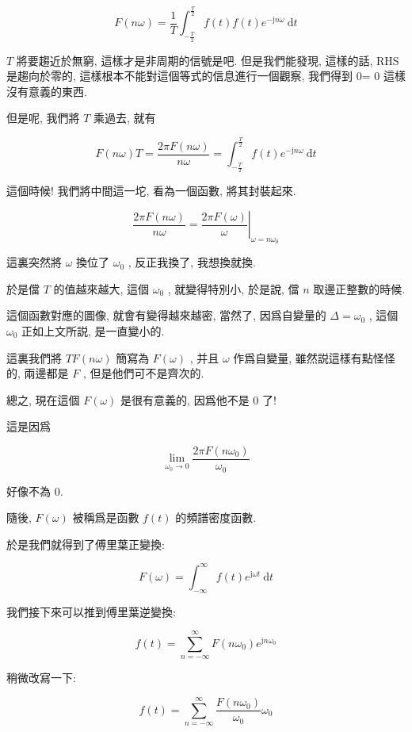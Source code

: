 \documentclass[a4paper, 10pt]{ctexbook} %
\begin{document}
$$ F \left( n \omega \right) =  \frac{1}{T} \int ^{\frac{T}{2}}_{-\frac{T}{2}} f\left(t\right) f\left(t\right) e ^{-\mathrm{j} n \omega  }\ \mathrm{d}t$$

$T$ 將要趨近於無窮, 這樣才是非周期的信號是吧. 但是我們能發現, 這樣的話, RHS是趨向於零的, 這樣根本不能對這個等式的信息進行一個觀察, 我們得到 0= 0 這樣沒有意義的東西. 

但是呢, 我們將 $T$ 乘過去, 就有

$$ F \left( n \omega\right) T =  \frac{2\pi F \left(n \omega \right)}{n \omega} = \int ^{\frac{T}{2}}_{- \frac{T}{2}} f\left(t\right) e^{ - \mathrm{j} n \omega   }\ \mathrm{d}t$$

這個時候! 我們將中間這一坨, 看為一個函數, 將其封裝起來.

$$\frac{2\pi F \left(n \omega \right)}{n\omega} = \left.\frac{2 \pi F \left(\omega\right)}{\omega} \right|_{\omega = n \omega_{0}}$$

這裏突然將 $\omega$ 換位了 $\omega _{0}$ , 反正我換了, 我想換就換. 

於是儅 $T$ 的值越來越大, 這個 $\omega _{0}$ , 就變得特別小, 於是說, 儅 $n$ 取邊正整數的時候. 

這個函數對應的圖像, 就會有變得越來越密, 當然了, 因爲自變量的 $\Delta = \omega _{0}$ , 這個 $\omega_0$ 正如上文所説, 是一直變小的. 

這裏我們將 $T F \left(n \omega\right)$ 簡寫為 $F \left(\omega\right)$ , 并且 $\omega$ 作爲自變量, 雖然説這樣有點怪怪的, 兩邊都是 $F$ , 但是他們可不是齊次的.

總之, 現在這個 $ F \left(\omega \right)$ 是很有意義的, 因爲他不是 $0$ 了! 

這是因爲 

$$\lim_{\omega_0 \to 0} \frac{2\pi F \left(n \omega_0\right)}{\omega_0}$$

好像不為 $0$.

隨後, $F \left(\omega\right)$ 被稱爲是函數 $f \left(t\right)$ 的頻譜密度函數. 

於是我們就得到了傅里葉正變換:

$$ F \left(\omega\right) = \int ^{\infty}_{-\infty} f\left(t\right) e^{ \mathrm{j} \omega t } \ \mathrm{d}t $$

我們接下來可以推到傅里葉逆變換:

$$ f\left(t\right) = \sum_{n = -\infty} ^{\infty} F \left(n \omega_0\right) e ^{\mathrm{j} n \omega_{0}}$$

稍微改寫一下:

$$f \left(t\right) = \sum_{n=-\infty} ^{\infty} \frac{F\left( n \omega_0\right)}{\omega_0} \omega _{0} $$
\end{document}

